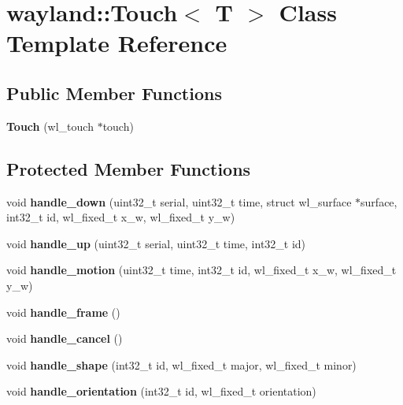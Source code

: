 \hypertarget{classwayland_1_1Touch}{}\section{wayland\+::Touch$<$ T $>$ Class Template Reference}
\label{classwayland_1_1Touch}
\subsection*{Public Member Functions}
\begin{DoxyCompactItemize}
\item 
\mbox{\label{classwayland_1_1Touch_a33902a0528468d2ddcbc89d070a4d797}} 
{\bfseries Touch} (wl\+\_\+touch $\ast$touch)
\end{DoxyCompactItemize}
\subsection*{Protected Member Functions}
\begin{DoxyCompactItemize}
\item 
\mbox{\label{classwayland_1_1Touch_a5492d323376552f12e881bb518148d43}} 
void {\bfseries handle\+\_\+down} (uint32\+\_\+t serial, uint32\+\_\+t time, struct wl\+\_\+surface $\ast$surface, int32\+\_\+t id, wl\+\_\+fixed\+\_\+t x\+\_\+w, wl\+\_\+fixed\+\_\+t y\+\_\+w)
\item 
\mbox{\label{classwayland_1_1Touch_a06e8074231977bd2a46707542156ef0e}} 
void {\bfseries handle\+\_\+up} (uint32\+\_\+t serial, uint32\+\_\+t time, int32\+\_\+t id)
\item 
\mbox{\label{classwayland_1_1Touch_afada1e025041b350dc6a26d2ba0e21c3}} 
void {\bfseries handle\+\_\+motion} (uint32\+\_\+t time, int32\+\_\+t id, wl\+\_\+fixed\+\_\+t x\+\_\+w, wl\+\_\+fixed\+\_\+t y\+\_\+w)
\item 
\mbox{\label{classwayland_1_1Touch_afceca5033de014c16c54ab166c46c93e}} 
void {\bfseries handle\+\_\+frame} ()
\item 
\mbox{\label{classwayland_1_1Touch_aa4768598cf32a6b4bcf6a601646c31c0}} 
void {\bfseries handle\+\_\+cancel} ()
\item 
\mbox{\label{classwayland_1_1Touch_a5a19cc6c4edd81bccbe0d4ee5e5051a2}} 
void {\bfseries handle\+\_\+shape} (int32\+\_\+t id, wl\+\_\+fixed\+\_\+t major, wl\+\_\+fixed\+\_\+t minor)
\item 
\mbox{\label{classwayland_1_1Touch_abe292a57e92598d7c828371fb6f2a64d}} 
void {\bfseries handle\+\_\+orientation} (int32\+\_\+t id, wl\+\_\+fixed\+\_\+t orientation)
\end{DoxyCompactItemize}
